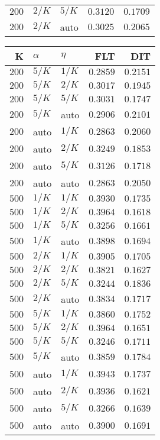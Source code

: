 \begin{table}
\begin{spacing}{1.2}
{\begin{tabular}{rll|rr}
$200$ &  $2/K$ &  $5/K$ &         $0.3120$ & $0.1709$ \\
$200$ &  $2/K$ &   auto &         $0.3025$ & $0.2065$ \\
\bottomrule
\end{tabular}
} \hfill \parbox{.45\linewidth}{\centering \begin{tabular}{rll|rr}
\toprule
    K &  $\alpha$ &    $\eta$ & FLT &        DIT \\
\midrule
$200$ &  $5/K$ &  $1/K$ &         $0.2859$ & $\bm{0.2151}$ \\
$200$ &  $5/K$ &  $2/K$ &         $0.3017$ &      $0.1945$ \\
$200$ &  $5/K$ &  $5/K$ &         $0.3031$ &      $0.1747$ \\
$200$ &  $5/K$ &   auto &         $0.2906$ &      $0.2101$ \\
$200$ &   auto &  $1/K$ &         $0.2863$ &      $0.2060$ \\
$200$ &   auto &  $2/K$ &         $0.3249$ &      $0.1853$ \\
$200$ &   auto &  $5/K$ &         $0.3126$ &      $0.1718$ \\
$200$ &   auto &   auto &         $0.2863$ &      $0.2050$ \\
$500$ &  $1/K$ &  $1/K$ &         $0.3930$ &      $0.1735$ \\
$500$ &  $1/K$ &  $2/K$ &    $\bm{0.3964}$ &      $0.1618$ \\
$500$ &  $1/K$ &  $5/K$ &         $0.3256$ &      $0.1661$ \\
$500$ &  $1/K$ &   auto &         $0.3898$ &      $0.1694$ \\
$500$ &  $2/K$ &  $1/K$ &         $0.3905$ &      $0.1705$ \\
$500$ &  $2/K$ &  $2/K$ &         $0.3821$ &      $0.1627$ \\
$500$ &  $2/K$ &  $5/K$ &         $0.3244$ &      $0.1836$ \\
$500$ &  $2/K$ &   auto &         $0.3834$ &      $0.1717$ \\
$500$ &  $5/K$ &  $1/K$ &         $0.3860$ &      $0.1752$ \\
$500$ &  $5/K$ &  $2/K$ &         $0.3964$ &      $0.1651$ \\
$500$ &  $5/K$ &  $5/K$ &         $0.3246$ &      $0.1711$ \\
$500$ &  $5/K$ &   auto &         $0.3859$ &      $0.1784$ \\
$500$ &   auto &  $1/K$ &         $0.3943$ &      $0.1737$ \\
$500$ &   auto &  $2/K$ &         $0.3936$ &      $0.1621$ \\
$500$ &   auto &  $5/K$ &         $0.3266$ &      $0.1639$ \\
$500$ &   auto &   auto &         $0.3900$ &      $0.1691$ \\
\bottomrule
\end{tabular}
}
\end{spacing}
\end{table}
